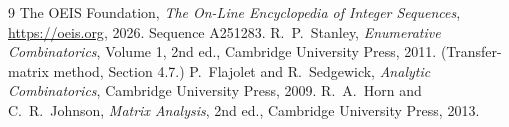 \documentclass[11pt,a4paper]{article}
\theoremstyle{plain}
\theoremstyle{definition}
\begin{document}
\begin{thebibliography}{9}
 The OEIS Foundation, \emph{The On-Line Encyclopedia of Integer
Sequences}, \url{https://oeis.org}, 2026. Sequence A251283.
 R.~P.~Stanley, \emph{Enumerative Combinatorics}, Volume 1, 2nd ed.,
Cambridge University Press, 2011. (Transfer-matrix method, Section 4.7.)
 P.~Flajolet and R.~Sedgewick, \emph{Analytic Combinatorics}, Cambridge
University Press, 2009.
 R.~A.~Horn and C.~R.~Johnson, \emph{Matrix Analysis}, 2nd ed., Cambridge
University Press, 2013.
\end{thebibliography}
\end{document}
